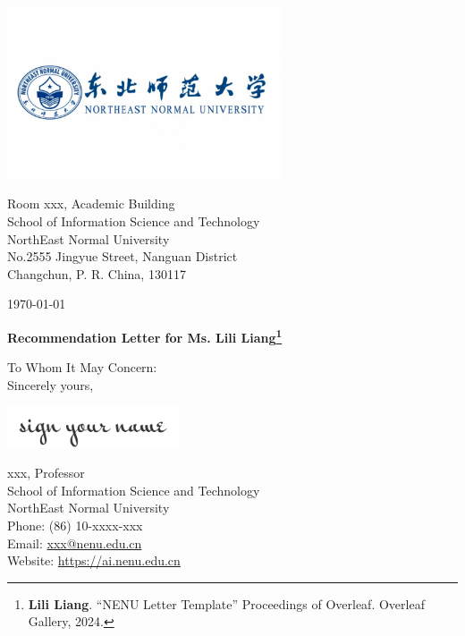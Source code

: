 \documentclass[12pt, a4paper]{letter} %
\begin{document}
    \begin{minipage}{0.5\textwidth}
        \includegraphics[width=3.2in]{pic/NENU_Logo.jpeg}\\ %
    \end{minipage}
    \hfill
    \begin{minipage}{0.6\textwidth}\raggedright
        \small{ 
            \hphantom{AA}Room xxx, Academic Building\\ %
            \hphantom{AA}School of Information Science and Technology\\
            \hphantom{AA}NorthEast Normal University\\
            \hphantom{AA}No.2555 Jingyue Street, Nanguan District\\
            \hphantom{AA}Changchun, P. R. China, 130117
        }
    \end{minipage}

    \today

    \textbf{Recommendation Letter for Ms. Lili Liang\footnote{\textbf{Lili Liang}. ``NENU Letter Template'' Proceedings of Overleaf. Overleaf Gallery, 2024.}}

    To Whom It May Concern:\\


    Sincerely yours,

    \includegraphics[width=2in]{pic/signature.png} %

    xxx, Professor\\
    School of Information Science and Technology\\
    NorthEast Normal University\\
    Phone: (86) 10-xxxx-xxx\\ 
    Email: \href{mailto:xxx@nenu.edu.cn}{xxx@nenu.edu.cn}\\
    Website: \url{https://ai.nenu.edu.cn}\\
\end{document}
